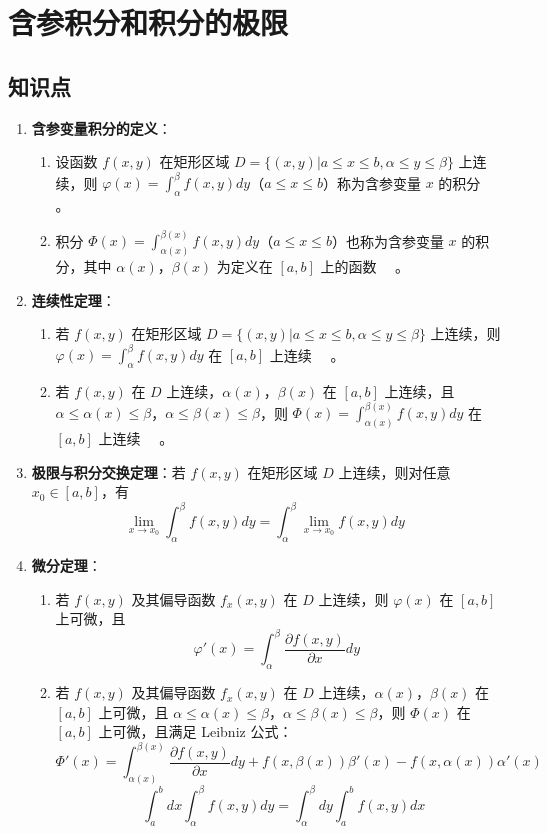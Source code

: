 \documentclass[UTF8]{ctexart}
\theoremstyle{remark}
\begin{document}
\section{含参积分和积分的极限}
\subsection*{知识点}
\begin{enumerate}
	\item \textbf{含参变量积分的定义}：
	\begin{enumerate}
		\item 设函数 \(f(x, y)\) 在矩形区域 \(D = \{(x, y) | a \leq x \leq b, \alpha \leq y \leq \beta\}\) 上连续，则 \(\varphi(x) = \int_{\alpha}^{\beta} f(x, y) d y\)（\(a \leq x \leq b\)）称为含参变量 \(x\) 的积分 \(\quad \text{}\)。
		\item 积分 \(\Phi(x) = \int_{\alpha(x)}^{\beta(x)} f(x, y) d y\)（\(a \leq x \leq b\)）也称为含参变量 \(x\) 的积分，其中 \(\alpha(x)\)，\(\beta(x)\) 为定义在 \([a, b]\) 上的函数 \(\quad \text{}\)。
	\end{enumerate}
	
	\item \textbf{连续性定理}：
	\begin{enumerate}
		\item 若 \(f(x, y)\) 在矩形区域 \(D = \{(x, y) | a \leq x \leq b, \alpha \leq y \leq \beta\}\) 上连续，则 \(\varphi(x) = \int_{\alpha}^{\beta} f(x, y) d y\) 在 \([a, b]\) 上连续 \(\quad \text{}\)。
		\item 若 \(f(x, y)\) 在 \(D\) 上连续，\(\alpha(x)\)，\(\beta(x)\) 在 \([a, b]\) 上连续，且 \(\alpha \leq \alpha(x) \leq \beta\)，\(\alpha \leq \beta(x) \leq \beta\)，则 \(\Phi(x) = \int_{\alpha(x)}^{\beta(x)} f(x, y) d y\) 在 \([a, b]\) 上连续 \(\quad \text{}\)。
	\end{enumerate}
	
	\item \textbf{极限与积分交换定理}：若 \(f(x, y)\) 在矩形区域 \(D\) 上连续，则对任意 \(x_{0} \in [a, b]\)，有
	\[
	\lim _{x \to x_{0}} \int_{\alpha}^{\beta} f(x, y) d y = \int_{\alpha}^{\beta} \lim _{x \to x_{0}} f(x, y) d y \quad \text{}
	\]
	
	\item \textbf{微分定理}：
	\begin{enumerate}
		\item 若 \(f(x, y)\) 及其偏导函数 \(f_{x}(x, y)\) 在 \(D\) 上连续，则 \(\varphi(x)\) 在 \([a, b]\) 上可微，且
		\[
		\varphi'(x) = \int_{\alpha}^{\beta} \frac{\partial f(x, y)}{\partial x} d y \quad \text{}
		\]
		\item 若 \(f(x, y)\) 及其偏导函数 \(f_{x}(x, y)\) 在 \(D\) 上连续，\(\alpha(x)\)，\(\beta(x)\) 在 \([a, b]\) 上可微，且 \(\alpha \leq \alpha(x) \leq \beta\)，\(\alpha \leq \beta(x) \leq \beta\)，则 \(\Phi(x)\) 在 \([a, b]\) 上可微，且满足 Leibniz 公式：
		\[
		\Phi'(x) = \int_{\alpha(x)}^{\beta(x)} \frac{\partial f(x, y)}{\partial x} d y + f(x, \beta(x)) \beta'(x) - f(x, \alpha(x)) \alpha'(x) \quad \text{}
		\]
		\[
		 \int_{a}^{b} dx \int_{\alpha}^{\beta} f(x,y) dy = \int_{\alpha}^{\beta} dy \int_{a}^{b} f(x,y) dx
		\]
	\end{enumerate}


\end{enumerate}
\end{document}
